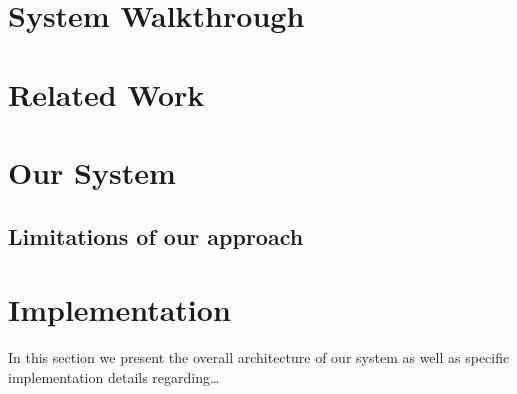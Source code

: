 \cleardoublepage
\chapter{System Walkthrough} \label{sec:walkthrough}


\cleardoublepage
\chapter{Related Work}





\cleardoublepage
\chapter{Our System} \label{chap:OurSystem}


\section{Limitations of our approach}\label{sec:limitations}



\cleardoublepage
\chapter{Implementation}

In this section we present the overall architecture of our system as well as specific implementation details regarding…





